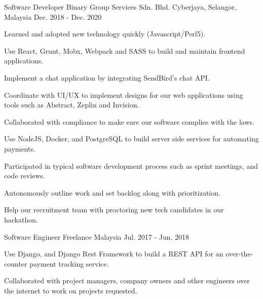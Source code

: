 \begin{cventries}
  \cventry
    {Software Developer} %
    {Binary Group Services Sdn. Bhd.} %
    {Cyberjaya, Selangor, Malaysia} %
    {Dec. 2018 - Dec. 2020} %
    {
      \begin{cvitems} %
        \item {Learned and adopted new technology quickly (Javascript/Perl5).}
        \item {Use React, Grunt, Mobx, Webpack and SASS to build and maintain frontend applications.}
        \item {Implement a chat application by integrating SendBird's chat API.}
        \item {Coordinate with UI/UX to implement designs for our web applications using tools such as Abstract, Zeplin and Invision.}
        \item {Collaborated with compliance to make sure our software complies with the laws.}
        \item {Use NodeJS, Docker, and PostgreSQL to build server side services for automating payments.}
        \item {Participated in typical software development process such as sprint meetings, and code reviews.}
        \item {Autonomously outline work and set backlog along with prioritization.}
        \item {Help our recruitment team with proctoring new tech candidates in our hackathon.}
      \end{cvitems}
    }

  \cventry
    {Software Engineer} %
    {Freelance} %
    {Malaysia} %
    {Jul. 2017 - Jun. 2018} %
    {
      \begin{cvitems} %
        \item {Use Django, and Django Rest Framework to build a REST API for an over-the-counter payment tracking service.}
        \item {Collaborated with project managers, company owners and other engineers over the internet to work on projects requested.}
      \end{cvitems}
    }
\end{cventries}
